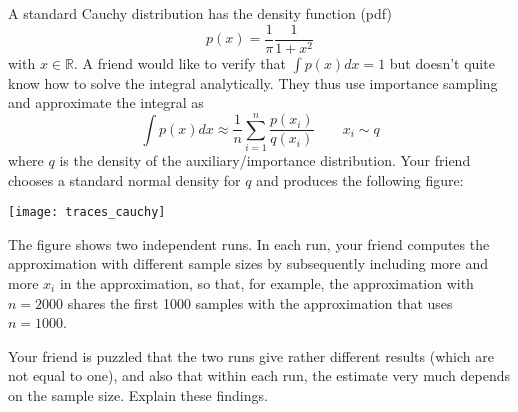 \label{ex:monte-carlo-integration-and-importance-sampling}
A standard Cauchy distribution has the density function (pdf)
\begin{equation}
  \label{eq:cauchy-pdf}
  p(x) = \frac{1}{\pi}\frac{1}{1+x^2}
\end{equation}
with $x \in \mathbb{R}$. A friend would like to verify that $\int p(x)
dx =1$ but doesn't quite know how to solve the integral
analytically. They thus use importance sampling and approximate the integral as
\begin{equation}
  \int p(x) dx \approx \frac{1}{n} \sum_{i=1}^n \frac{p(x_i)}{q(x_i)} \quad \quad x_i \sim q
\end{equation}
where $q$ is the density of the auxiliary/importance
distribution. Your friend chooses a standard normal density for $q$
and produces the following figure:
\begin{center}
  \texttt{[image: traces\_cauchy]}
\end{center}
The figure shows two independent runs. In each run, your friend
computes the approximation with different sample sizes by subsequently
including more and more $x_i$ in the approximation, so that, for example, the
approximation with $n=2000$ shares the first 1000 samples with the
approximation that uses $n=1000$.

Your friend is puzzled that the two runs give rather different results
(which are not equal to one), and also that within each run, the
estimate very much depends on the sample size. Explain these findings.

